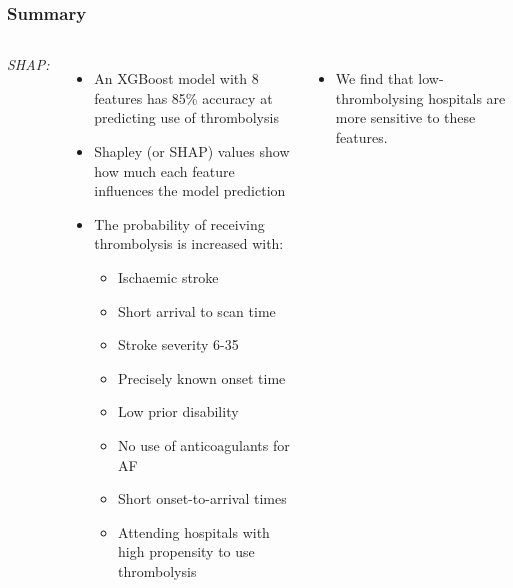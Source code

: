 \documentclass[xcolor={usenames,dvipsnames}]{beamer}
\begin{document}

\begin{frame}
\frametitle{Summary}

\begin{columns}
    \emph{SHAP:}
    \begin{itemize}
      \footnotesize 
      \item An XGBoost model with 8 features has 85\% accuracy at predicting use of thrombolysis
      \item Shapley (or SHAP) values show how much each feature influences the model prediction
      \item The probability of receiving thrombolysis is increased with:
      \begin{itemize}
        \tiny 
        \item Ischaemic stroke
        \item Short arrival to scan time
        \item Stroke severity 6-35
        \item Precisely known onset time
        \item Low prior disability
        \item No use of anticoagulants for AF
        \item Short onset-to-arrival times
        \item Attending hospitals with high propensity to use thrombolysis
      \end{itemize}
    \end{itemize}

    \begin{itemize}
      \footnotesize 
      \item We find that low-thrombolysing hospitals are 
      more sensitive to these features.
    \end{itemize}
    

\end{columns}
\end{frame}
\end{document}

